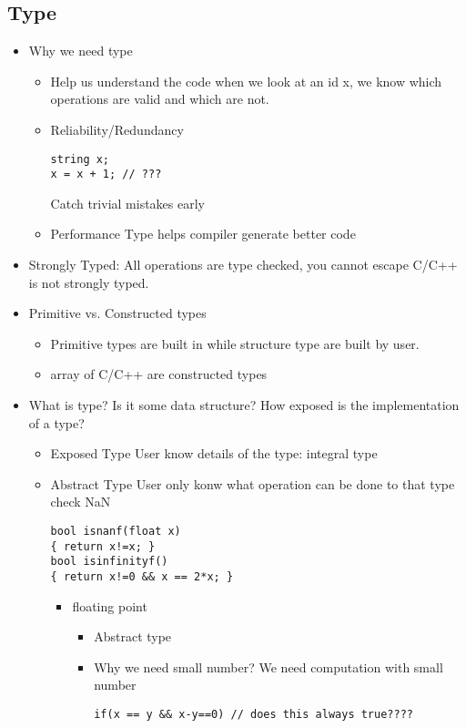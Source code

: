 \documentclass[11pt]{article}
\begin{document}
\subsection{Type}
\label{sec:org4aa901e}
\begin{itemize}
\item Why we need type
\begin{itemize}
\item Help us understand the code
when we look at an id x, we know which operations are valid and which are
not.
\item Reliability/Redundancy
\begin{verbatim}
string x;
x = x + 1; // ???
\end{verbatim}
Catch trivial mistakes early
\item Performance
Type helps compiler generate better code
\end{itemize}

\item Strongly Typed: All operations are type checked, you cannot escape
C/C++ is not strongly typed.

\item Primitive vs. Constructed types
\begin{itemize}
\item Primitive types are built in while structure type are built by user.
\item array of C/C++ are constructed types
\end{itemize}

\item What is type? Is it some data structure? How exposed is the implementation of
a type?
\begin{itemize}
\item Exposed Type
User know details of the type: integral type

\item Abstract Type
User only konw what operation can be done to that type
check NaN
\begin{verbatim}
bool isnanf(float x)
{ return x!=x; }
bool isinfinityf()
{ return x!=0 && x == 2*x; }
\end{verbatim}

\begin{itemize}
\item floating point
\begin{itemize}
\item Abstract type
\item Why we need small number?
We need computation with small number
\begin{verbatim}
if(x == y && x-y==0) // does this always true????
\end{verbatim}
\end{itemize}
\end{itemize}
\end{itemize}
\end{itemize}
\end{document}
